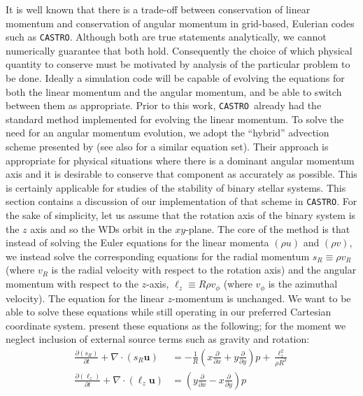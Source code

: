 \documentclass[twocolumn,numberedappendix]{../aastex6}
\newcommand{\castro}{\texttt{CASTRO}}
\begin{document}
It is well known that there is a trade-off between conservation of linear
momentum and conservation of angular momentum in grid-based, Eulerian codes
such as \castro. Although both are true statements analytically, we cannot
numerically guarantee that both hold. Consequently the choice of which
physical quantity to conserve must be motivated by analysis of the particular
problem to be done. Ideally a simulation code will be capable of evolving the
equations for both the linear momentum and the angular momentum, and be
able to switch between them as appropriate. Prior to this work, \castro\
already had the standard method implemented for evolving the linear momentum.
To solve the need for an angular momentum evolution, we adopt the ``hybrid''
advection scheme presented by \cite{byerly:2014} (see also \cite{motl:2002} for
a similar equation set). Their approach is appropriate for physical situations
where there is a dominant angular momentum axis and it is desirable to conserve
that component as accurately as possible. This is certainly applicable for
studies of the stability of binary stellar systems. This section contains a
discussion of our implementation of that scheme in \castro. For the sake
of simplicity, let us assume that the rotation axis of the binary system is the $z$
axis and so the WDs orbit in the $xy$-plane. The core of the method is that instead
of solving the Euler equations for the linear momenta $(\rho u)$ and $(\rho v)$,
we instead solve the corresponding equations for the radial momentum
$s_R \equiv \rho v_R$ (where $v_R$ is the radial velocity with respect to the
rotation axis) and the angular momentum with respect to the $z$-axis,
$\ell_z \equiv R\rho v_\phi$ (where $v_\phi$ is the azimuthal velocity).
The equation for the linear $z$-momentum is unchanged. We want to be able
to solve these equations while still operating in our preferred Cartesian
coordinate system. \cite{byerly:2014} present these equations as the following;
for the moment we neglect inclusion of external source terms such as gravity and rotation:
\begin{align}
  \frac{\partial(s_R)}{\partial t} + \nabla \cdot (s_R \mathbf{u}) &=
    - \frac{1}{R}\left(x \frac{\partial}{\partial x} + y \frac{\partial}{\partial y}\right) p
    + \frac{\ell_z^2}{\rho R^3} \label{eq:radial-momentum}\\
    \frac{\partial(\ell_z)}{\partial t} + \nabla \cdot (\ell_z \mathbf{u}) &=
  \left(y\frac{\partial}{\partial x} - x \frac{\partial}{\partial y}\right) p \label{eq:angular-momentum}
\end{align}  
\end{document}
